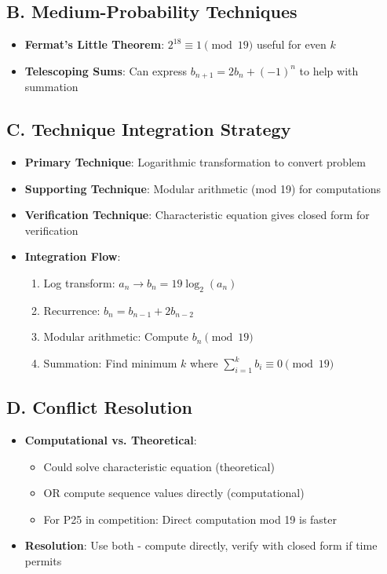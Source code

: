 \documentclass[11pt]{article}
\begin{document}
\begin{conversionbox}
\subsection*{B. Medium-Probability Techniques}
\begin{itemize}[leftmargin=*]
    \item \textbf{Fermat's Little Theorem}: $2^{18} \equiv 1 \pmod{19}$ useful for even $k$
    
    \item \textbf{Telescoping Sums}: Can express $b_{n+1} = 2b_n + (-1)^n$ to help with summation
\end{itemize}

\subsection*{C. Technique Integration Strategy}
\begin{itemize}[leftmargin=*]
    \item \textbf{Primary Technique}: Logarithmic transformation to convert problem
    
    \item \textbf{Supporting Technique}: Modular arithmetic (mod 19) for computations
    
    \item \textbf{Verification Technique}: Characteristic equation gives closed form for verification
    
    \item \textbf{Integration Flow}:
    \begin{enumerate}
        \item Log transform: $a_n \rightarrow b_n = 19\log_2(a_n)$
        \item Recurrence: $b_n = b_{n-1} + 2b_{n-2}$
        \item Modular arithmetic: Compute $b_n \pmod{19}$
        \item Summation: Find minimum $k$ where $\sum_{i=1}^{k} b_i \equiv 0 \pmod{19}$
    \end{enumerate}
\end{itemize}

\subsection*{D. Conflict Resolution}
\begin{itemize}[leftmargin=*]
    \item \textbf{Computational vs. Theoretical}: 
    \begin{itemize}
        \item Could solve characteristic equation (theoretical)
        \item OR compute sequence values directly (computational)
        \item For P25 in competition: Direct computation mod 19 is faster
    \end{itemize}
    
    \item \textbf{Resolution}: Use both - compute directly, verify with closed form if time permits
\end{itemize}
\end{conversionbox}
\end{document}
